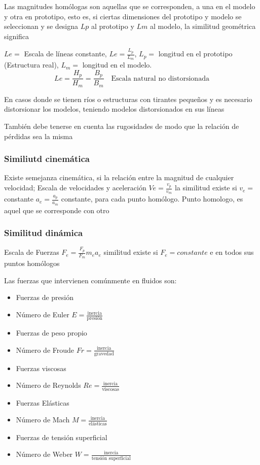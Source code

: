 Las magnitudes homólogas son aquellas que se corresponden, a una en el modelo y otra en prototipo, esto es, si ciertas dimensiones del prototipo y modelo se seleccionan y se designa $Lp$ al prototipo y $Lm$ al modelo, la similitud geométrica significa

$Le=$ Escala de líneas constante, $Le=\frac{L_p}{L_m}$, $L_p=$ longitud en el prototipo (Estructura real), $L_m=$ longitud en el modelo.
\begin{equation}
    Le = \frac{H_p}{H_m} = \frac{B_p}{B_m}\quad \text{Escala natural no distorsionada}
\end{equation}

En casos donde se tienen ríos o estructuras con tirantes pequeños y es necesario
distorsionar los modelos, teniendo modelos distorsionados en sus líneas 

También debe tenerse en cuenta las rugosidades de modo que la relación de
pérdidas sea la misma

\subsubsection{Similiutd cinemática}
Existe semejanza cinemática, si la relación entre la magnitud de cualquier
velocidad; Escala de velocidades y aceleración $Ve= \frac{v_p}{v_m}$ la similitud existe si $v_e=$constante $a_e=\frac{a_p}{a_m}$ constante, para cada punto homólogo.
Punto homologo, es aquel que se corresponde con otro

\subsubsection{Similitud dinámica}
Escala de Fuerzas $F_e=\frac{F_p}{F_m}m_ea_e$  similitud existe si $F_e=constante$ e en todos sus puntos homólogos

Las fuerzas que intervienen comúnmente en fluidos son:
\begin{itemize}
    \item Fuerzas de presión
    \item Número de Euler $E=\frac{\text{inercia}}{\text{presión}}$
    \item Fuerzas de peso propio
    \item Número de Froude $Fr=\frac{\text{inercia}}{\text{gravedad}}$
    \item Fuerzas viscosas
    \item Número de Reynolds $Re=\frac{\text{inercia}}{\text{viscosas}}$ 
    \item Fuerzas Elásticas
    \item Número de Mach $M=\frac{\text{inercia}}{\text{elásticas}}$
    \item Fuerzas de tensión superficial
    \item Número de Weber $W=\frac{\text{inercia}}{\text{tensión superficial}}$
\end{itemize}

